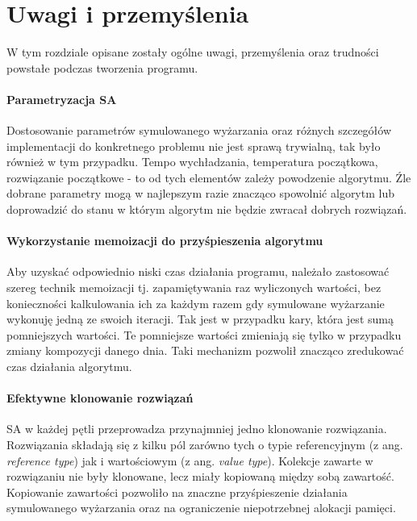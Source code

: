 \chapter{Uwagi i przemyślenia}
W tym rozdziale opisane zostały ogólne uwagi, przemyślenia oraz trudności
powstałe podczas tworzenia programu.

\subsubsection{Parametryzacja SA}
Dostosowanie parametrów symulowanego wyżarzania oraz różnych szczegółów
implementacji do konkretnego problemu nie jest sprawą trywialną, tak było
również w tym przypadku. Tempo wychładzania, temperatura początkowa, rozwiązanie
początkowe - to od tych elementów zależy powodzenie algorytmu. Źle dobrane
parametry mogą w najlepszym razie znacząco spowolnić algorytm lub doprowadzić do
stanu w którym algorytm nie będzie zwracał dobrych rozwiązań.

\subsubsection{Wykorzystanie memoizacji do przyśpieszenia algorytmu}
Aby uzyskać odpowiednio niski czas działania programu,
należało zastosować szereg technik memoizacji tj. zapamiętywania raz wyliczonych
wartości, bez konieczności kalkulowania ich za każdym razem gdy symulowane
wyżarzanie wykonuję jedną ze swoich iteracji. Tak jest w przypadku kary, która
jest sumą pomniejszych wartości. Te pomniejsze wartości zmieniają się tylko w
przypadku zmiany kompozycji danego dnia. Taki mechanizm pozwolił znacząco
zredukować czas działania algorytmu.

\subsubsection{Efektywne klonowanie rozwiązań}
SA w każdej pętli przeprowadza przynajmniej jedno klonowanie rozwiązania.
Rozwiązania składają się z kilku pól zarówno tych o typie referencyjnym (z ang.
\emph{reference type}) jak i wartościowym (z ang. \emph{value type}). Kolekcje
zawarte w rozwiązaniu nie były klonowane, lecz miały kopiowaną między sobą
zawartość. Kopiowanie zawartości pozwoliło na znaczne przyśpieszenie działania
symulowanego wyżarzania oraz na ograniczenie niepotrzebnej alokacji pamięci.
